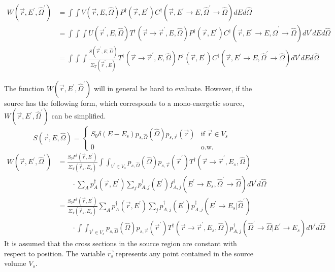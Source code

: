 \begin{align}
  W(\vec{r},E^{'},\hat{\Omega}^{'}) & = \int\int V(\vec{r},E,\hat{\Omega})
  P^{\dagger}(\vec{r},E^{'})
  C^{\dagger}(\vec{r},E^{'} \to E,\hat{\Omega}^{'} \to \hat{\Omega})dEd\hat{\Omega}
  \nonumber \\
  & = \int\int\int U(\vec{r}^{'},E,\hat{\Omega})
  T^{\dagger}(\vec{r} \to \vec{r}^{'},E,\hat{\Omega}) P^{\dagger}(\vec{r},E^{'})
  C^{\dagger}(\vec{r},E^{'} \to E, \hat{\Omega}^{'} \to \hat{\Omega})
  dV^{'}dEd\hat{\Omega} \nonumber \\
  & = \int\int\int \frac{S(\vec{r}^{'},E,\hat{\Omega})}
  {\Sigma_T(\vec{r}^{'},E)}
  T^{\dagger}(\vec{r} \to \vec{r}^{'},E,\hat{\Omega}) P^{\dagger}(\vec{r},E^{'})
  C^{\dagger}(\vec{r},E^{'} \to E, \hat{\Omega}^{'} \to \hat{\Omega})
  dV^{'}dEd\hat{\Omega}
\end{align}

The function $W(\vec{r},E^{'},\hat{\Omega}^{'})$ will in general be hard to 
evaluate. However, if the source has the following form, which corresponds to
a mono-energetic source, $W(\vec{r},E^{'},\hat{\Omega}^{'})$ can be simplified. 
\begin{equation}
  S(\vec{r},E,\hat{\Omega}) = 
  \begin{cases}
    S_0 \delta(E - E_s) p_{s,\hat{\Omega}}(\hat{\Omega})p_{s,\vec{r}}(\vec{r}) 
    & \text{if } \vec{r} \in V_s \\
    0 & \text{o.w.}
  \end{cases}
\end{equation}
\begin{align}
  W(\vec{r},E^{'},\hat{\Omega}^{'}) & = \frac{S_0 P^{\dagger}(\vec{r},E^{'})}
  {\Sigma_T(\vec{r}_s,E_s)}\int\int_{V^{'} \in V_s} p_{s,\hat{\Omega}}(\hat{\Omega})
  p_{s,\vec{r}}(\vec{r}^{'}) T^{\dagger}(\vec{r} \to \vec{r}^{'},E_s,\hat{\Omega})
  \nonumber \\
  & \qquad\cdot 
  \sum_A p_A^{\dagger}(\vec{r},E^{'}) \sum_j p_{A,j}^{\dagger}(E^{'})
  f_{A,j}^{\dagger}(E^{'} \to E_s,\hat{\Omega}^{'} \to \hat{\Omega}) 
  dV^{'}d\hat{\Omega} \nonumber \\
  & = \frac{S_0 P^{\dagger}(\vec{r},E^{'})}{\Sigma_T(\vec{r}_s,E_s)}
  \sum_A p_A^{\dagger}(\vec{r},E^{'}) \sum_j p_{A,j}^{\dagger}(E^{'})
  p_{A,j}^{\dagger}(E^{'} \to E_s|\hat{\Omega}^{'}) \nonumber \\
  & \qquad\cdot \int\int_{V^{'} \in V_s} 
  p_{s,\hat{\Omega}}(\hat{\Omega}) p_{s,\vec{r}}(\vec{r}^{'}) 
  T^{\dagger}(\vec{r} \to \vec{r}^{'},E_s,\hat{\Omega})
  p_{A,j}^{\dagger}(\hat{\Omega}^{'} \to \hat{\Omega}|E^{'} \to E_s) 
  dV^{'}d\hat{\Omega} \nonumber
\end{align}
It is assumed that the cross sections in the source region are constant with 
respect to position. The variable $\vec{r_s}$ represents any point contained in
the source volume $V_s$.

